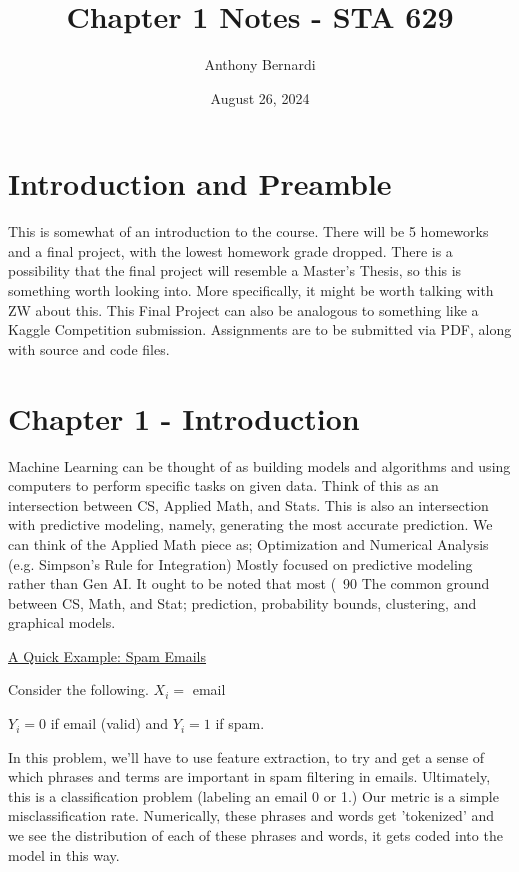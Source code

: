 \documentclass[12pt, letterpaper]{article}
\title{Chapter 1 Notes - STA 629}
\author{Anthony Bernardi}
\date{August 26, 2024}
\begin{document}
\maketitle

\section{Introduction and Preamble}

This is somewhat of an introduction to the course. There will be 5 homeworks and a final project, with the lowest homework grade dropped. There is a possibility that the final project will resemble a Master's Thesis, so this is something worth looking into. More specifically, it might be worth talking with ZW about this. 
This Final Project can also be analogous to something like a Kaggle Competition submission. 
Assignments are to be submitted via PDF, along with source and code files. 

\section{Chapter 1 - Introduction}

Machine Learning can be thought of as building models and algorithms and using computers to perform specific tasks on given data. 
Think of this as an intersection between CS, Applied Math, and Stats. 
This is also an intersection with predictive modeling, namely, generating the most accurate prediction. 
We can think of the Applied Math piece as; Optimization and Numerical Analysis (e.g. Simpson's Rule for Integration)
Mostly focused on predictive modeling rather than Gen AI. 
It ought to be noted that most (~90 %
The common ground between CS, Math, and Stat; prediction, probability bounds, clustering, and graphical models. 

\underline{A Quick Example: Spam Emails}

Consider the following. 
$X_i =$ email

$Y_i = 0$ if email (valid) and $Y_i = 1$ if spam.

In this problem, we'll have to use feature extraction, to try and get a sense of which phrases and terms are important in spam filtering in emails. 
Ultimately, this is a classification problem (labeling an email 0 or 1.)
Our metric is a simple misclassification rate. 
Numerically, these phrases and words get 'tokenized' and we see the distribution of each of these phrases and words, it gets coded into the model in this way.
\end{document}
